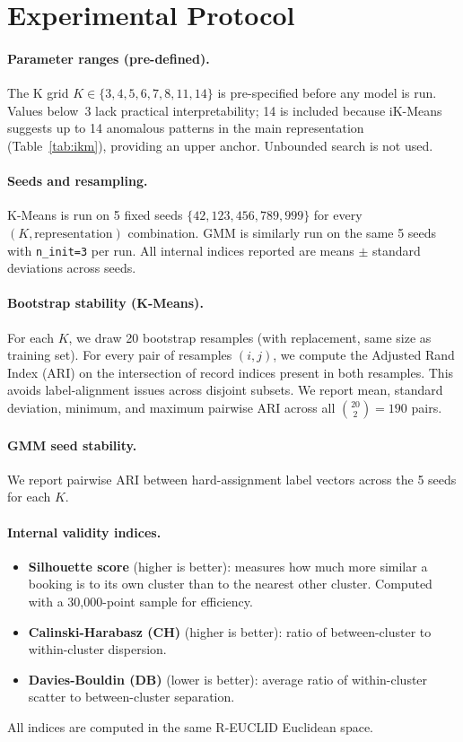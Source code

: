 \documentclass[12pt,a4paper]{article}
\begin{document}
\section{Experimental Protocol}
\label{sec:protocol}

\paragraph{Parameter ranges (pre-defined).}
The K grid $K \in \{3, 4, 5, 6, 7, 8, 11, 14\}$ is pre-specified before
any model is run.
Values below~3 lack practical interpretability; 14 is included because
iK-Means suggests up to 14 anomalous patterns in the main representation
(Table~\ref{tab:ikm}), providing an upper anchor.
Unbounded search is not used.

\paragraph{Seeds and resampling.}
K-Means is run on 5 fixed seeds $\{42, 123, 456, 789, 999\}$ for every
$(K, \text{representation})$ combination.
GMM is similarly run on the same 5 seeds with \texttt{n\_init=3} per run.
All internal indices reported are means $\pm$ standard deviations across seeds.

\paragraph{Bootstrap stability (K-Means).}
For each $K$, we draw 20 bootstrap resamples (with replacement, same size
as training set).
For every pair of resamples $(i,j)$, we compute the Adjusted Rand Index
(ARI) on the intersection of record indices present in both resamples.
This avoids label-alignment issues across disjoint subsets.
We report mean, standard deviation, minimum, and maximum pairwise ARI
across all $\binom{20}{2}=190$ pairs.

\paragraph{GMM seed stability.}
We report pairwise ARI between hard-assignment label vectors across the
5 seeds for each $K$.

\paragraph{Internal validity indices.}
\begin{itemize}[noitemsep]
  \item \textbf{Silhouette score} (higher is better): measures how much
        more similar a booking is to its own cluster than to the nearest
        other cluster. Computed with a 30,000-point sample for efficiency.
  \item \textbf{Calinski-Harabasz (CH)} (higher is better): ratio of
        between-cluster to within-cluster dispersion.
  \item \textbf{Davies-Bouldin (DB)} (lower is better): average ratio of
        within-cluster scatter to between-cluster separation.
\end{itemize}
All indices are computed in the same R-EUCLID Euclidean space.
\end{document}

